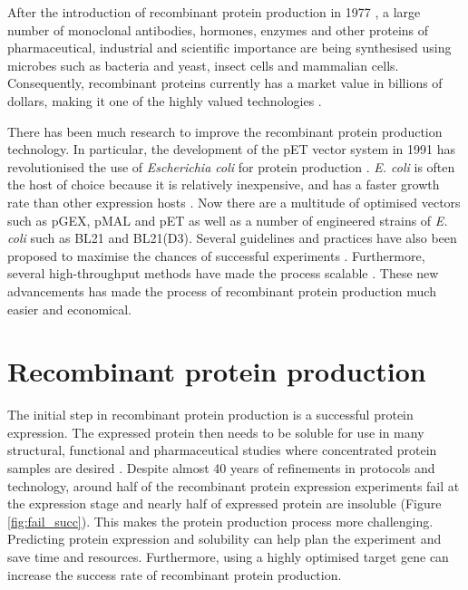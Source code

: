 After the introduction of recombinant protein production in 1977 \cite{itakura1977expression}, a large number of monoclonal antibodies, hormones, enzymes and other proteins of pharmaceutical, industrial and scientific importance are being synthesised using microbes such as bacteria and yeast, insect cells and mammalian cells. Consequently, recombinant proteins currently has a market value in billions of dollars, making it one of the highly valued technologies \cite{walsh2014biopharmaceutical, puetz2019recombinant}. 


There has been much research to improve the recombinant protein production technology. In particular, the development of the pET vector system in 1991 has revolutionised the use of \textit{Escherichia coli} for protein production \cite{dubendorf1991controlling}. \textit{E. coli} is often the host of choice because it is relatively inexpensive, and has a faster growth rate than other expression hosts \cite{Rosano2014-oq, demain2009production}. Now there are a multitude of optimised vectors such as pGEX, pMAL and pET as well as a number of engineered strains of \textit{E. coli} such as BL21 and BL21(D3). Several guidelines and practices have also been proposed to maximise the chances of successful experiments \cite{Berlec2013-mb, Rosano2014-oq}. Furthermore, several high-throughput methods have made the process scalable \cite{stevens2000design, braun2003high, jia2016high}. These new advancements has made the process of recombinant protein production much easier and economical. 


\section{Recombinant protein production}
The initial step in recombinant protein production is a successful protein expression. The expressed protein then needs to be soluble for use in many structural, functional and pharmaceutical studies where concentrated protein samples are desired \cite{Kramer2012-wk, Hou2018-yd}. Despite almost 40 years of refinements in protocols and technology, around half of the recombinant protein expression experiments fail at the expression stage and nearly half of expressed protein are insoluble \cite{targetdbmetrices} (Figure \ref{fig:fail_succ}). This makes the protein production process more challenging. Predicting protein expression and solubility can help plan the experiment and save time and resources. Furthermore, using a highly optimised target gene can increase the success rate of recombinant protein production.


